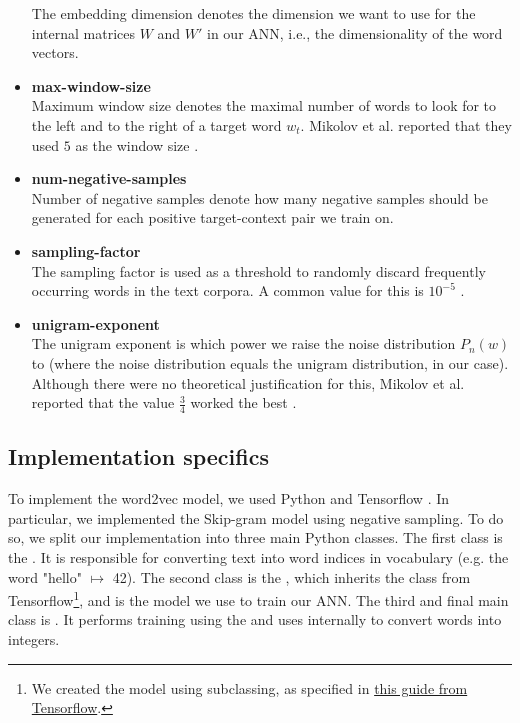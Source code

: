 \begin{itemize}
        The embedding dimension denotes the dimension we want to use for the internal matrices $W$ and $W'$ in our ANN, i.e., the dimensionality of the word vectors.
    \item \textbf{max-window-size} \\
        Maximum window size denotes the maximal number of words to look for to the left and to the right of a target word $w_t$. Mikolov et al. reported that they used $5$ as the window size \cite{mikolov2013b}.
    \item \textbf{num-negative-samples} \\
        Number of negative samples denote how many negative samples should be generated for each positive target-context pair we train on.
    \item \textbf{sampling-factor} \\
        The sampling factor is used as a threshold to randomly discard frequently occurring words in the text corpora. A common value for this is $10^{-5}$ \cite{mikolov2013b}.
    \item \textbf{unigram-exponent} \\
        The unigram exponent is which power we raise the noise distribution $P_n(w)$ to (where the noise distribution equals the unigram distribution, in our case). Although there were no theoretical justification for this, Mikolov et al. reported that the value $\frac{3}{4}$ worked the best \cite{mikolov2013b}.
\end{itemize}

\subsection{Implementation specifics}
To implement the word2vec model, we used Python and Tensorflow \cite{python3-2009, tensorflow2015-whitepaper}. In particular, we implemented the Skip-gram model using negative sampling. To do so, we split our implementation into three main Python classes. The first class is the . It is responsible for converting text into word indices in vocabulary (e.g. the word "hello" $\mapsto$ 42). The second class is the , which inherits the  class from Tensorflow\footnote{We created the model using subclassing, as specified in \href{https://www.tensorflow.org/guide/keras/custom_layers_and_models}{this guide from Tensorflow}.}, and is the model we use to train our ANN. The third and final main class is . It performs training using the  and uses  internally to convert words into integers.

